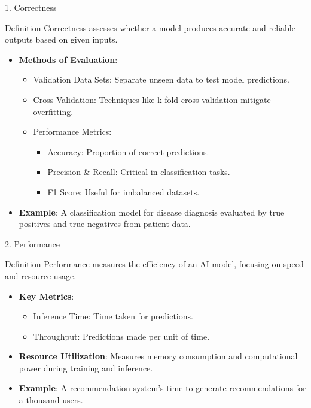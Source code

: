 \documentclass[aspectratio=169]{beamer}
\begin{document}
\begin{frame}[fragile]{1. Correctness}
    \begin{block}{Definition}
        Correctness assesses whether a model produces accurate and reliable outputs based on given inputs.
    \end{block}
    
    \begin{itemize}
        \item \textbf{Methods of Evaluation}:
            \begin{itemize}
                \item Validation Data Sets: Separate unseen data to test model predictions.
                \item Cross-Validation: Techniques like k-fold cross-validation mitigate overfitting.
                \item Performance Metrics:
                    \begin{itemize}
                        \item Accuracy: Proportion of correct predictions.
                        \item Precision \& Recall: Critical in classification tasks.
                        \item F1 Score: Useful for imbalanced datasets.
                    \end{itemize}
            \end{itemize}
        \item \textbf{Example}: A classification model for disease diagnosis evaluated by true positives and true negatives from patient data.
    \end{itemize}
\end{frame}

\begin{frame}[fragile]{2. Performance}
    \begin{block}{Definition}
        Performance measures the efficiency of an AI model, focusing on speed and resource usage.
    \end{block}
    
    \begin{itemize}
        \item \textbf{Key Metrics}:
            \begin{itemize}
                \item Inference Time: Time taken for predictions.
                \item Throughput: Predictions made per unit of time.
            \end{itemize}
        \item \textbf{Resource Utilization}: 
            Measures memory consumption and computational power during training and inference.
        \item \textbf{Example}: A recommendation system's time to generate recommendations for a thousand users.
    \end{itemize}
\end{frame}
\end{document}
